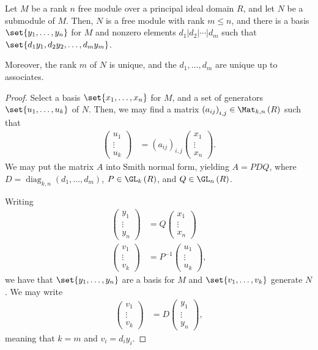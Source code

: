 \documentclass[10pt]{mypackage}
\begin{document}
\begin{theorem}
  Let $M$ be a rank $n$ free module over a principal ideal domain $R$, and let $N$ be a submodule of $M$. Then, $N$ is a free module with rank $m\leq n$, and there is a basis $\set{y_1,\dots,y_n}$ for $M$ and nonzero elements $d_1 | d_2 | \cdots | d_m$ such that $\set{d_1y_1,d_2y_2,\dots,d_my_m}$.

  Moreover, the rank $m$ of $N$ is unique, and the $d_1,\dots,d_m$ are unique up to associates.
\end{theorem}
\begin{proof}
  Select a basis $\set{x_1,\dots,x_n}$ for $M$, and a set of generators $\set{u_1,\dots,u_k}$ of $N$. Then, we may find a matrix $\left( a_{ij} \right)_{i,j}\in \Mat_{k,n}\left( R \right)$ such that
  \begin{align*}
    \begin{pmatrix}u_1\\\vdots\\u_k\end{pmatrix} &= \left( a_{ij} \right)_{i,j} \begin{pmatrix}x_1\\\vdots\\x_n\end{pmatrix}.
  \end{align*}
  We may put the matrix $A$ into Smith normal form, yielding $A = PDQ$, where $D = \operatorname{diag}_{k,n}\left( d_1,\dots,d_m \right)$, $P\in \GL_k\left( R \right)$, and $Q\in \GL_n\left( R \right)$.

  Writing
  \begin{align*}
    \begin{pmatrix}y_1\\\vdots\\y_n\end{pmatrix} &= Q \begin{pmatrix}x_1\\\vdots\\x_n\end{pmatrix}\\
    \begin{pmatrix}v_1\\\vdots\\v_k\end{pmatrix} &= P^{-1} \begin{pmatrix}u_1\\\vdots\\u_k\end{pmatrix},
  \end{align*}
  we have that $\set{y_1,\dots,y_n}$ are a basis for $M$ and $\set{v_1,\dots,v_k}$ generate $N$. We may write
  \begin{align*}
    \begin{pmatrix}v_1\\\vdots\\v_k\end{pmatrix} &= D \begin{pmatrix}y_1\\\vdots\\y_n\end{pmatrix},
  \end{align*}
  meaning that $k = m$ and $v_i = d_iy_i$.
\end{proof}
\end{document}
